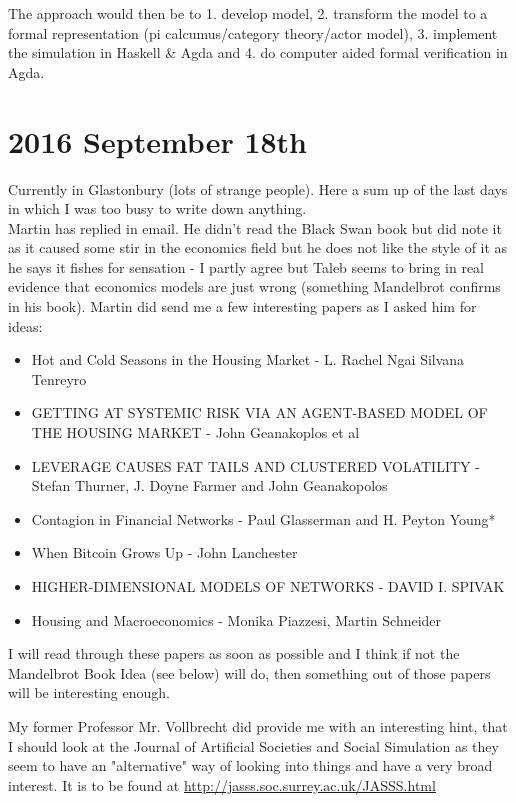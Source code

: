 The approach would then be to 1. develop model, 2. transform the model to a formal representation (pi calcumus/category theory/actor model), 3. implement the simulation in Haskell \& Agda and 4. do computer aided formal verification in Agda.

\section*{2016 September 18th}
Currently in Glastonbury (lots of strange people). Here a sum up of the last days in which I was too busy to write down anything. \\

Martin has replied in email. He didn't read the Black Swan book but did note it as it caused some stir in the economics field but he does not like the style of it as he says it fishes for sensation - I partly agree but Taleb seems to bring in real evidence that economics models are just wrong (something Mandelbrot confirms in his book). Martin did send me a few interesting papers as I asked him for ideas:

\begin{itemize}
\item Hot and Cold Seasons in the Housing Market - L. Rachel Ngai Silvana Tenreyro
\item GETTING AT SYSTEMIC RISK VIA AN AGENT-BASED MODEL OF THE HOUSING MARKET - John Geanakoplos et al
\item LEVERAGE CAUSES FAT TAILS AND CLUSTERED VOLATILITY - Stefan Thurner, J. Doyne Farmer and John Geanakopolos
\item Contagion in Financial Networks - Paul Glasserman and H. Peyton Young*
\item When Bitcoin Grows Up - John Lanchester
\item HIGHER-DIMENSIONAL MODELS OF NETWORKS - DAVID I. SPIVAK
\item Housing and Macroeconomics - Monika Piazzesi, Martin Schneider
\end{itemize}

I will read through these papers as soon as possible and I think if not the Mandelbrot Book Idea (see below) will do, then something out of those papers will be interesting enough.

\bigskip

My former Professor Mr. Vollbrecht did provide me with an interesting hint, that I should look at the Journal of Artificial Societies and Social Simulation as they seem to have an "alternative" way of looking into things and have a very broad interest. It is to be found at \url{http://jasss.soc.surrey.ac.uk/JASSS.html}

